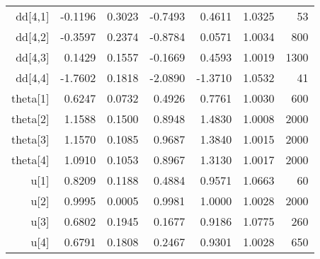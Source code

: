 \begin{table}[ht]
\begin{tabular}{rrrrrrr}
  dd[4,1] & -0.1196 & 0.3023 & -0.7493 & 0.4611 & 1.0325 &    53 \\ 
  dd[4,2] & -0.3597 & 0.2374 & -0.8784 & 0.0571 & 1.0034 &   800 \\ 
  dd[4,3] & 0.1429 & 0.1557 & -0.1669 & 0.4593 & 1.0019 &  1300 \\ 
  dd[4,4] & -1.7602 & 0.1818 & -2.0890 & -1.3710 & 1.0532 &    41 \\ 
  theta[1] & 0.6247 & 0.0732 & 0.4926 & 0.7761 & 1.0030 &   600 \\ 
  theta[2] & 1.1588 & 0.1500 & 0.8948 & 1.4830 & 1.0008 &  2000 \\ 
  theta[3] & 1.1570 & 0.1085 & 0.9687 & 1.3840 & 1.0015 &  2000 \\ 
  theta[4] & 1.0910 & 0.1053 & 0.8967 & 1.3130 & 1.0017 &  2000 \\ 
  u[1] & 0.8209 & 0.1188 & 0.4884 & 0.9571 & 1.0663 &    60 \\ 
  u[2] & 0.9995 & 0.0005 & 0.9981 & 1.0000 & 1.0028 &  2000 \\ 
  u[3] & 0.6802 & 0.1945 & 0.1677 & 0.9186 & 1.0775 &   260 \\ 
  u[4] & 0.6791 & 0.1808 & 0.2467 & 0.9301 & 1.0028 &   650 \\ 
   \hline
\end{tabular}
\end{table}
